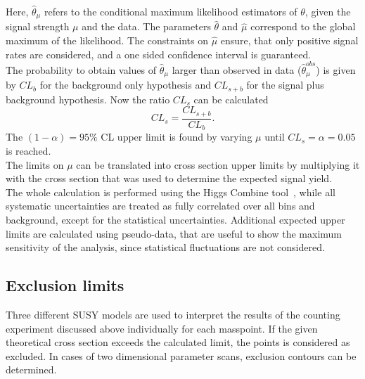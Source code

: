 Here, $\hat{\theta}_{\mu}$ refers to the conditional maximum likelihood estimators of $\theta$, given the signal strength $\mu$ and the data. The parameters $\hat{\theta}$ and $\hat{\mu}$ correspond to the global maximum of the likelihood. The constraints on $\hat{\mu}$ ensure, that only positive signal rates are considered, and a one sided confidence interval is guaranteed.\\
The probability to obtain values of $\hat{\theta}_{\mu}$ larger than observed in data ($\hat{\theta}_{\mu}^{obs}$) is given by $CL_b$ for the background only hypothesis and $CL_{s+b}$ for the signal plus background hypothesis. Now the ratio $CL_s$ can be calculated
\begin{equation}
 CL_s=\frac{CL_{s+b}}{CL_b}.
\end{equation}
The $(1-\alpha)=95\%$ CL upper limit is found by varying $\mu$ until $CL_s = \alpha=0.05$ is reached.\\
The limits on $\mu$ can be translated into cross section upper limits by multiplying it with the cross section that was used to determine the expected signal yield.\\
The whole calculation is performed using the Higgs Combine tool~\cite{CLS3}, while all systematic uncertainties are treated as fully correlated over all bins and background, except for the statistical uncertainties.
Additional expected upper limits are calculated using pseudo-data, that are useful to show the maximum sensitivity of the analysis, since statistical fluctuations are not considered.


\subsection{Exclusion limits}
Three different SUSY models are used to interpret the results of the counting experiment discussed above individually for each masspoint. If the given theoretical cross section exceeds the calculated limit, the points is considered as excluded. In cases of two dimensional parameter scans, exclusion contours can be determined.


